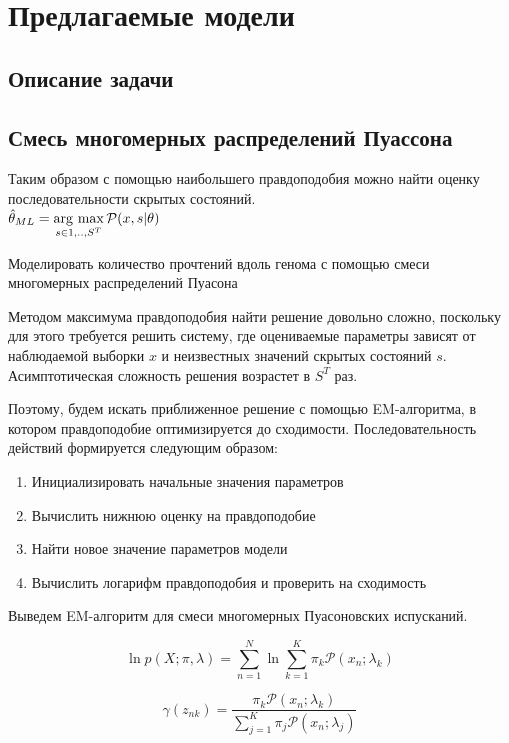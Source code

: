 \documentclass{matmex-diploma}
\begin{document}
\section{Предлагаемые модели}
\subsection{Описание задачи}
\subsection{Смесь многомерных распределений Пуассона}

Таким образом с помощью наибольшего правдоподобия можно найти оценку последовательности скрытых состояний.
\\
\newcommand{\argmax}{\mathop{\rm arg~max}\limits}
$\hat{\theta}_{ML} = \argmax_{s \in {1,..,S}^T} \mathcal{P}(x,s|\theta)$

Моделировать количество прочтений вдоль генома с помощью смеси многомерных распределений Пуасона

Методом максимума правдоподобия найти решение довольно сложно, поскольку для этого требуется решить систему, где оцениваемые параметры зависят от наблюдаемой выборки $x$ и неизвестных значений скрытых состояний $s$. Асимптотическая сложность решения возрастет в $S^T$ раз.

Поэтому, будем искать приближенное решение с помощью EM-алгоритма, в котором правдоподобие оптимизируется до сходимости. Последовательность действий формируется следующим образом\cite{book:Bishop}:
\begin{enumerate}
\item
Инициализировать начальные значения параметров
\item
Вычислить нижнюю оценку на правдоподобие
\item
Найти новое значение параметров модели
\item
Вычислить логарифм правдоподобия и проверить на сходимость
\end{enumerate}

Выведем EM-алгоритм для смеси многомерных Пуасоновских испусканий.

\begin{equation}
\ln p(X;\pi,\lambda) = \sum_{n=1}^N \ln{\sum_{k=1}^K} \pi_k \mathcal{P}(x_n;\lambda_k)
\end{equation}

\begin{equation}
\gamma(z_{nk}) = \frac{\pi_k\mathcal{P}(x_n;\lambda_k)}{\sum_{j=1}^K\pi_j\mathcal{P}(x_n;\lambda_j)}
\end{equation}
\end{document}

